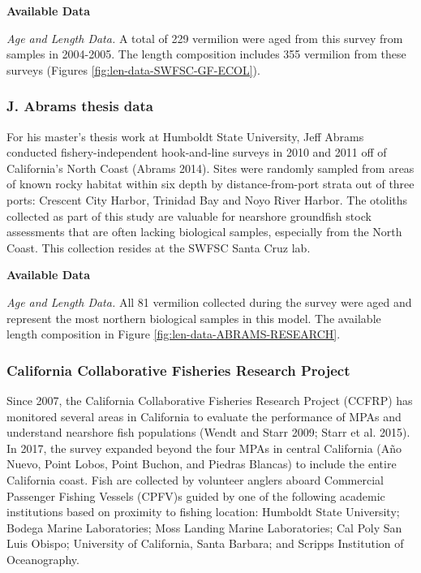 \documentclass[
  english,
  a4paper,
]{article}
\begin{document}
\textbf{Available Data}

\emph{Age and Length Data.}
A total of 229 vermilion were aged from this survey from samples in 2004-2005.
The length composition includes 355 vermilion from these surveys
(Figures \ref{fig:len-data-SWFSC-GF-ECOL}).

\hypertarget{j.-abrams-thesis-data}{%
\subsubsection{J. Abrams thesis data}\label{j.-abrams-thesis-data}}

For his master's thesis work at Humboldt State University, Jeff Abrams conducted fishery-independent
hook-and-line surveys in 2010 and 2011 off of California's North Coast (Abrams 2014). Sites were randomly sampled from
areas of known rocky habitat within six depth by distance-from-port strata out of three ports:
Crescent City Harbor, Trinidad Bay and Noyo River Harbor. The otoliths collected as part of this
study are valuable for nearshore groundfish stock assessments that are often lacking biological samples,
especially from the North Coast. This collection resides at the SWFSC Santa Cruz lab.

\textbf{Available Data}

\emph{Age and Length Data.}
All 81 vermilion collected during the survey were aged and represent the most northern biological
samples in this model. The available length composition in Figure
\ref{fig:len-data-ABRAMS-RESEARCH}.

\hypertarget{california-collaborative-fisheries-research-project}{%
\subsubsection{California Collaborative Fisheries Research Project}\label{california-collaborative-fisheries-research-project}}

Since 2007, the California Collaborative Fisheries Research Project (CCFRP)
has monitored several areas in California to
evaluate the performance of MPAs and understand nearshore fish populations
(Wendt and Starr 2009; Starr et al. 2015). In 2017, the survey expanded beyond the four
MPAs in central California
(Año Nuevo, Point Lobos, Point Buchon, and Piedras Blancas)
to include the entire California coast.
Fish are collected by volunteer anglers aboard Commercial Passenger Fishing Vessels (CPFV)s guided by one of
the following academic institutions based on proximity to fishing location:
Humboldt State University;
Bodega Marine Laboratories;
Moss Landing Marine Laboratories;
Cal Poly San Luis Obispo;
University of California, Santa Barbara; and
Scripps Institution of Oceanography.
\end{document}
